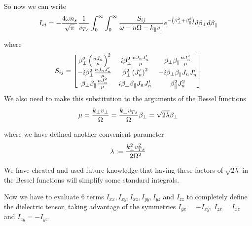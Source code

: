 So now we can write 
\begin{equation}
	I_{ij} = -\frac{4 \omega n_s}{\sqrt{\pi}} \frac{1}{v_{Ts}} \int_0^\infty \int_0^\infty \frac{S_{ij}}{\omega-n\Omega-k_\parallel v_\parallel} e^{-\left(\beta_\perp^2 + \beta_\parallel^2\right)} d\beta_\perp d\beta_\parallel
\end{equation}

where
\begin{equation}
	S_{ij} =
	\begin{bmatrix}
		\beta_\perp^2 \left(\frac{nJ_n}{\mu}\right)^2 & i\beta_\perp^2 \frac{nJ_nJ_n'}{\mu} & \beta_\perp \beta_\parallel \frac{nJ_n^2}{\mu}\\
		- i\beta_\perp^2 \frac{nJ_nJ_n'}{\mu} & \beta_\perp^2 \left(J_n'\right)^2 & -i \beta_\perp \beta_\parallel J_n J_n'\\
		\beta_\perp \beta_\parallel \frac{nJ_n^2}{\mu}  & i \beta_\perp \beta_\parallel J_n J_n' & \beta_\parallel^2 J_n^2\\
	\end{bmatrix}
\end{equation}
We also need to make this substitution to the arguments of the Bessel functions
\begin{equation}
	\mu = \frac{k_\perp v_\perp}{\Omega} = \frac{k_\perp v_{Ts}}{\Omega} \beta_\perp = \sqrt{2 \lambda} \beta_\perp
\end{equation}
 
 where we have defined another convenient parameter
 \begin{equation}
 	\lambda := \frac{k_\perp^2 v_{Ts}^2}{2 \Omega^2}
 \end{equation}

We have cheated and used future knowledge that having these factors of $\sqrt{2 \lambda}$ in the Bessel functions will simplify some standard integrals.

Now we have to evaluate 6 terms $I_{xx} ,I_{xy}, I_{xz}, I_{yy}, I_{yz}$ and $I_{zz}$ to completely define the dielectric tensor, taking advantage of the symmetries $I_{yx} = -I_{xy}$, $I_{zx} = I_{xz}$ and $I_{zy} = -I_{yz}$.
